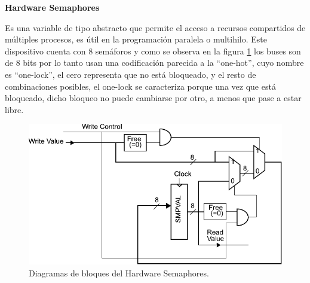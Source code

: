 \documentclass[11pt,a4paper]{article}
\begin{document}
{\Large \textbf{Hardware Semaphores}}

Es una variable de tipo abstracto que permite el acceso a recursos compartidos de múltiples procesos, es útil en la programación paralela o multihilo. Este dispositivo cuenta con 8 semáforos y como se observa en la figura \ref{fig:hardware_semaphoresl} los buses son de 8 bits por lo tanto usan una codificación parecida a la ``one-hot'', cuyo nombre es ``one-lock'', el cero representa que no está bloqueado, y el resto de combinaciones posibles, el one-lock se caracteriza porque una vez que está bloqueado, dicho bloqueo no puede cambiarse por otro, a menos que pase a estar libre.

\begin{figure}[H]
    \centering
    \includegraphics{images/hardware_semaphores.pdf}
    \caption{Diagramas de bloques del Hardware Semaphores.}
    \label{fig:hardware_semaphoresl}
\end{figure}

\fontsize{7.5}{1.2}\selectfont
\nocite{*}


\end{document}
